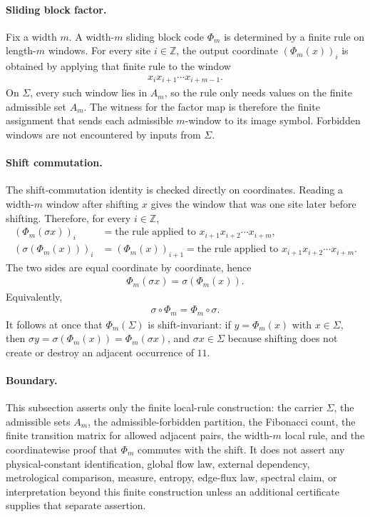 \paragraph{Sliding block factor.}
Fix a width $m$. A width-$m$ sliding block code $\Phi_m$ is determined by a finite rule on length-$m$ windows. For every site $i\in\mathbb Z$, the output coordinate $(\Phi_m(x))_i$ is obtained by applying that finite rule to the window
$$
\begin{aligned}
x_i x_{i+1}\cdots x_{i+m-1}.
\end{aligned}
$$
On $\Sigma$, every such window lies in $A_m$, so the rule only needs values on the finite admissible set $A_m$. The witness for the factor map is therefore the finite assignment that sends each admissible $m$-window to its image symbol. Forbidden windows are not encountered by inputs from $\Sigma$.

\paragraph{Shift commutation.}
The shift-commutation identity is checked directly on coordinates. Reading a width-$m$ window after shifting $x$ gives the window that was one site later before shifting. Therefore, for every $i\in\mathbb Z$,
$$
\begin{aligned}
(\Phi_m(\sigma x))_i&=\text{the rule applied to }x_{i+1}x_{i+2}\cdots x_{i+m},\\
(\sigma(\Phi_m(x)))_i&=(\Phi_m(x))_{i+1}=\text{the rule applied to }x_{i+1}x_{i+2}\cdots x_{i+m}.
\end{aligned}
$$
The two sides are equal coordinate by coordinate, hence
$$
\begin{aligned}
\Phi_m(\sigma x)=\sigma(\Phi_m(x)).
\end{aligned}
$$
Equivalently,
$$
\begin{aligned}
\sigma\circ\Phi_m=\Phi_m\circ\sigma.
\end{aligned}
$$
It follows at once that $\Phi_m(\Sigma)$ is shift-invariant: if $y=\Phi_m(x)$ with $x\in\Sigma$, then $\sigma y=\sigma(\Phi_m(x))=\Phi_m(\sigma x)$, and $\sigma x\in\Sigma$ because shifting does not create or destroy an adjacent occurrence of $11$.

\paragraph{Boundary.}
This subsection asserts only the finite local-rule construction: the carrier $\Sigma$, the admissible sets $A_m$, the admissible-forbidden partition, the Fibonacci count, the finite transition matrix for allowed adjacent pairs, the width-$m$ local rule, and the coordinatewise proof that $\Phi_m$ commutes with the shift. It does not assert any physical-constant identification, global flow law, external dependency, metrological comparison, measure, entropy, edge-flux law, spectral claim, or interpretation beyond this finite construction unless an additional certificate supplies that separate assertion.
